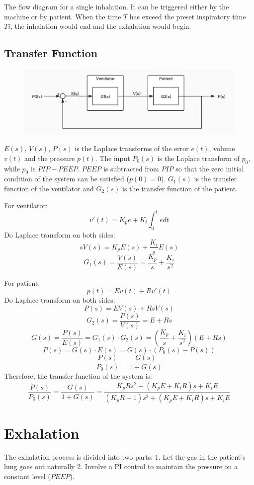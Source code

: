 \documentclass{article}
\begin{document}
The flow diagram for a single inhalation. It can be triggered either by the machine or by patient. When the time $T$ has exceed the preset inspiratory time $Ti$, the inhalation would end and the exhalation would begin.

\newpage

\subsection{Transfer Function}
\begin{figure}[h]
\centering
\includegraphics[scale=0.3]{block-diagram.jpg}
\end{figure}

$E(s)$, $V(s)$, $P(s)$ is the Laplace transforms of the error $e(t)$, volume $v(t)$ and the pressure $p(t)$. The input $P_{0}(s)$ is the Laplace transform of $p_{0}$, while $p_{0}$ is $PIP-PEEP$. $PEEP$ is subtracted from $PIP$ so that the zero initial condition of the system can be satisfied ($p(0)=0$). $G_1(s)$ is the transfer function of the ventilator and $G_2(s)$ is the transfer function of the patient.

For ventilator:
$$v'(t)=K_pe+K_i\int _0^tedt$$
Do Laplace transform on both sides:
$$sV(s)=K_pE(s)+\frac{K_i}{s}E(s)$$
$$G_1(s)=\frac{V(s)}{E(s)}=\frac{K_p}{s}+\frac{K_i}{s^2}$$

For patient:
$$p(t)=Ev(t)+Rv'(t)$$
Do Laplace transform on both sides:
$$P(s)=EV(s)+RsV(s)$$
$$G_2(s)=\frac{P(s)}{V(s)}=E+Rs$$
$$G(s)=\frac{P(s)}{E(s)}=G_1(s)\cdot G_2(s)=(\frac{K_p}{s}+\frac{K_i}{s^2})(E+Rs)$$
$$P(s)=G(s)\cdot E(s)=G(s)\cdot (P_0(s)-P(s))$$
$$\frac{P(s)}{P_0(s)}=\frac{G(s)}{1+G(s)}$$
Therefore, the transfer function of the system is:
$$\frac{P(s)}{P_0(s)}=\frac{G(s)}{1+G(s)}=\frac{K_pRs^2+(K_pE+K_iR)s+K_iE}{(K_pR+1)s^2+(K_pE+K_iR)s+K_iE}$$

\section{Exhalation}
The exhalation process is divided into two parts: 1. Let the gas in the patient's lung goes out naturally 2. Involve a PI control to maintain the pressure on a constant level ($PEEP$). 
\end{document}
